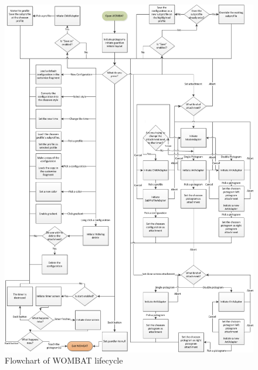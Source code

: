 \begin{figure}[H]
	\centering
		\includegraphics[scale=0.6]{Images/Implementation/wombatLifeCycle.png}
	\caption{Flowchart of WOMBAT lifecycle}
	\label{fig:wombatLifeCycle}
\end{figure}